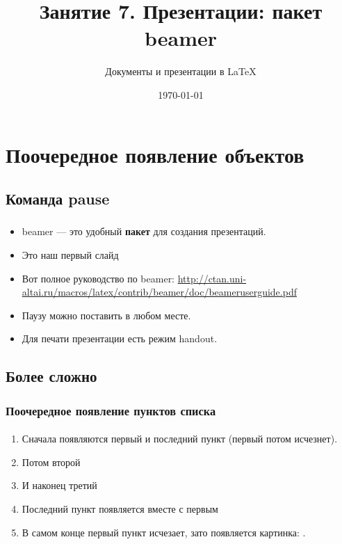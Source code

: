 \documentclass[t]{beamer}  %
\title{Занятие 7. Презентации: пакет beamer}
\subtitle{Документы и презентации в \LaTeX}
\date{\today}
\begin{document}
\frame[plain]{\titlepage}	%

\section{Поочередное появление объектов}
\subsection{Команда pause}
 
\begin{frame}
	\frametitle{\insertsection} 
	\framesubtitle{\insertsubsection}
	\begin{itemize}
		\item beamer ---  это \alert{удобный} \textbf{пакет} для создания презентаций.
		\item Это наш первый слайд \pause
		\item Вот полное руководство по beamer:  \href{http://ctan.uni-altai.ru/macros/latex/contrib/beamer/doc/beameruserguide.pdf}{http://ctan.uni-altai.ru/macros/latex/contrib/beamer/doc/beameruserguide.pdf} \pause
		\item Паузу можно поставить в любом \pause месте.
		\item Для печати презентации есть режим handout.
	\end{itemize}
\end{frame}

\subsection{Более сложно}

\begin{frame}
	\frametitle{Поочередное появление пунктов списка}
	\framesubtitle{\insertsubsection}
    \begin{enumerate}
        \item<1-5> Сначала появляются первый и последний пункт (первый потом исчезнет).
        \item<2-> Потом второй
        \item<3-> И наконец третий
        \item<1-> Последний пункт появляется вместе с первым
    	\item<6-> В самом конце первый пункт исчезает, зато появляется картинка: \insertlogo.
    \end{enumerate}
\end{frame}
\end{document}
